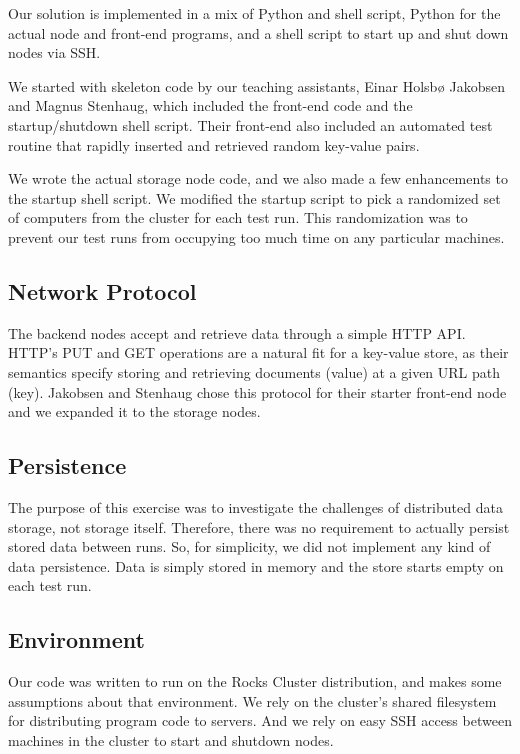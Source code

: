 \documentclass[11pt,conference]{IEEEtran}
\begin{document}
Our solution is implemented in a mix of Python and shell script, Python for the
actual node and front-end programs, and a shell script to start up and shut down
nodes via SSH.

We started with skeleton code by our teaching assistants, Einar Holsbø Jakobsen
and Magnus Stenhaug, which included the front-end code and the startup/shutdown
shell script. Their front-end also included an automated test routine that
rapidly inserted and retrieved random key-value pairs.

We wrote the actual storage node code, and we also made a few enhancements to
the startup shell script. We modified the startup script to pick a randomized
set of computers from the cluster for each test run. This randomization was to
prevent our test runs from occupying too much time on any particular machines.


\subsection{Network Protocol}

The backend nodes accept and retrieve data through a simple HTTP API. HTTP's PUT
and GET operations are a natural fit for a key-value store, as their semantics
specify storing and retrieving documents (value) at a given URL path (key).
Jakobsen and Stenhaug chose this protocol for their starter front-end node and
we expanded it to the storage nodes.


\subsection{Persistence}

The purpose of this exercise was to investigate the challenges of distributed
data storage, not storage itself. Therefore, there was no requirement to
actually persist stored data between runs. So, for simplicity, we did not
implement any kind of data persistence. Data is simply stored in memory and the
store starts empty on each test run.


\subsection{Environment}

Our code was written to run on the Rocks Cluster distribution\cite{rocks}, and
makes some assumptions about that environment. We rely on the cluster's shared
filesystem for distributing program code to servers. And we rely on easy SSH
access between machines in the cluster to start and shutdown nodes.
\end{document}
